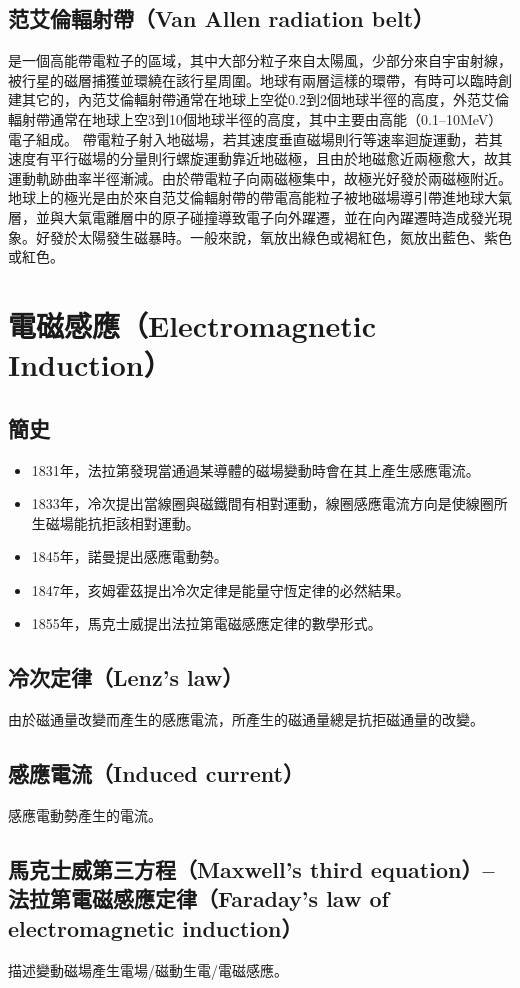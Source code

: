 \documentclass[a4paper,12pt]{report}
\begin{document}
\begin{itemize}
\subsection{范艾倫輻射帶（Van Allen radiation belt）}
是一個高能帶電粒子的區域，其中大部分粒子來自太陽風，少部分來自宇宙射線，被行星的磁層捕獲並環繞在該行星周圍。地球有兩層這樣的環帶，有時可以臨時創建其它的，內范艾倫輻射帶通常在地球上空從0.2到2個地球半徑的高度，外范艾倫輻射帶通常在地球上空3到10個地球半徑的高度，其中主要由高能（0.1–10MeV）電子組成。
帶電粒子射入地磁場，若其速度垂直磁場則行等速率迴旋運動，若其速度有平行磁場的分量則行螺旋運動靠近地磁極，且由於地磁愈近兩極愈大，故其運動軌跡曲率半徑漸減。由於帶電粒子向兩磁極集中，故極光好發於兩磁極附近。
地球上的極光是由於來自范艾倫輻射帶的帶電高能粒子被地磁場導引帶進地球大氣層，並與大氣電離層中的原子碰撞導致電子向外躍遷，並在向內躍遷時造成發光現象。好發於太陽發生磁暴時。一般來說，氧放出綠色或褐紅色，氮放出藍色、紫色或紅色。


\section{電磁感應（Electromagnetic Induction）}
\subsection{簡史}
\begin{itemize}
\item 1831年，法拉第發現當通過某導體的磁場變動時會在其上產生感應電流。
\item 1833年，冷次提出當線圈與磁鐵間有相對運動，線圈感應電流方向是使線圈所生磁場能抗拒該相對運動。
\item 1845年，諾曼提出感應電動勢。
\item 1847年，亥姆霍茲提出冷次定律是能量守恆定律的必然結果。
\item 1855年，馬克士威提出法拉第電磁感應定律的數學形式。
\end{itemize}
\subsection{冷次定律（Lenz's law）}
由於磁通量改變而產生的感應電流，所產生的磁通量總是抗拒磁通量的改變。
\subsection{感應電流（Induced current）}
感應電動勢產生的電流。
\subsection{馬克士威第三方程（Maxwell's third equation）–法拉第電磁感應定律（Faraday's law of electromagnetic induction）}
描述變動磁場產生電場/磁動生電/電磁感應。

\end{itemize}
\end{document}
